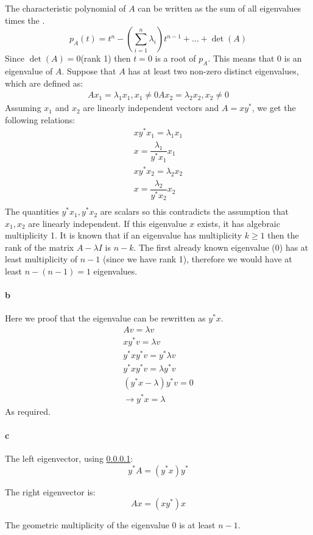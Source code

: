 The characteristic polynomial of $A$ can be written as the sum of all eigenvalues times the .
\begin{equation*}
p_{A}(t) = t^n - (\sum\limits_{i=1}^n \lambda_i) t^{n-1} + \ldots + \det(A)
\end{equation*}
Since $\det (A) = 0 $(rank 1) then $t = 0$ is a root of $p_A$. This means that 0 is an eigenvalue of $A$. 
Suppose that $A$ has at least two non-zero distinct eigenvalues, which are defined as:
\begin{gather*}
A x_1 = \lambda_1 x_1,x_1 \neq 0
A x_2 = \lambda_2 x_2,x_2 \neq 0
\end{gather*}
Assuming $x_1$ and $x_2$ are linearly independent vectors and $A = xy^*$, we get the following relations:
\begin{gather*}
xy^* x_1 = \lambda_1 x_1 \\
x = \dfrac{\lambda_1}{y^* x_1} x_1 \\
xy^* x_2 = \lambda_2 x_2 \\
x = \dfrac{\lambda_2}{y^* x_2} x_2 \\
\end{gather*}
The quantities $y^* x_1 , y^* x_2$ are scalars so this contradicts the assumption that $x_1,x_2$ are linearly independent. If this eigenvalue $x$ exists, it has algebraic multiplicity 1. It is known that if an eigenvalue has multiplicity $k \geq 1$ then the rank of the matrix $A-\lambda I$ is $n-k$. The first already known eigenvalue (0) has at least multiplicity of $n-1$ (since we have rank 1), therefore we would have at least $n-(n-1) = 1$ eigenvalues. 

\paragraph{b}
\label{par:b}
Here we proof that the eigenvalue can be rewritten as $y^* x$.
\begin{gather*}
A v = \lambda v \\
xy^* v = \lambda v \\
y^* xy^* v = y^* \lambda v \\
y^* x y^* v = \lambda y^* v \\
(y^* x - \lambda ) y^* v = 0 \\
\rightarrow y^* x = \lambda
\end{gather*}
As required.
\paragraph{c}
The left eigenvector, using \ref{par:b}:
\begin{equation}
y^* A = (y^*x) y^*
\end{equation}

The right eigenvector is:
\begin{equation}
Ax = (xy^*) x
\end{equation}

The geometric multiplicity of the eigenvalue 0 is at least $n-1$.